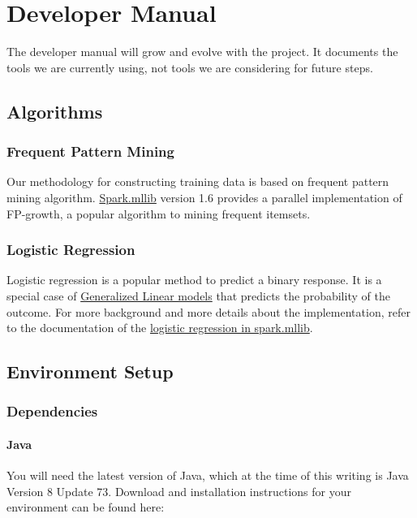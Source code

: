 \chapter{Developer Manual}\label{ch:developerManual}

The developer manual will grow and evolve with the project. It documents the tools we are currently using, not tools we are considering for future steps.

\section{Algorithms}

\subsection{Frequent Pattern Mining}
Our methodology for constructing training data is based on frequent pattern mining algorithm. \href{https://spark.apache.org/docs/1.6.0/mllib-frequent-pattern-mining.html}{Spark.mllib} version 1.6 provides a parallel implementation of FP-growth, a popular algorithm to mining frequent itemsets. 
\subsection{Logistic Regression}
Logistic regression is a popular method to predict a binary response. It is a special case of \href{https://en.wikipedia.org/wiki/Generalized_linear_model}{Generalized Linear models} that predicts the probability of the outcome. For more background and more details about the implementation, refer to the documentation of the \href{https://spark.apache.org/docs/1.6.0/mllib-linear-methods.html#logistic-regression}{logistic regression in spark.mllib}.
\section{Environment Setup}

\subsection{Dependencies}

\subsubsection{Java}
You will need the latest version of Java, which at the time of this writing is Java Version 8 Update 73. Download and installation instructions for your environment can be found here:

